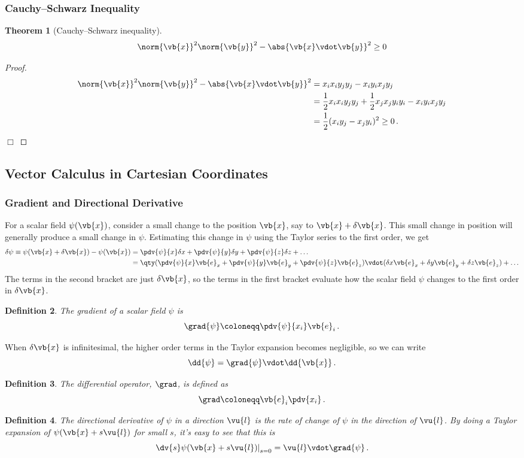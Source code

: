 \documentclass{article}
\theoremstyle{plain}\theoremheaderfont{\normalfont\itshape}\theorembodyfont{\rmfamily}\theoremseparator{.}\newtheorem*{rem}{Remark}\newtheorem*{ex}{Example}\newtheorem*{proof}{Proof}\newtheorem*{altp}{Alternative proof}
\theoremstyle{plain}\theoremheaderfont{\normalfont\bfseries}\theorembodyfont{\rmfamily}\theoremseparator{.}\newtheorem{thm}{Theorem}[section]\newtheorem{lem}[thm]{Lemma}\newtheorem{prop}[thm]{Proposition}\newtheorem*{cor}{Corollary}\newtheorem{defn}[thm]{Definition}\newtheorem{clm}[thm]{Claim}\newtheorem{clminproof}{Claim}
\theoremstyle{break}\theoremheaderfont{\normalfont\itshape}\theorembodyfont{\rmfamily}\theoremseparator{.\medskip}\newtheorem*{proofskip}{Proof}\newtheorem*{exs}{Examples}\newtheorem*{rems}{Remarks}
\theoremstyle{break}\theoremheaderfont{\normalfont\bfseries}\theorembodyfont{\rmfamily}\theoremseparator{.\medskip}\newtheorem{lemskip}[thm]{Lemma}\newtheorem{defnskip}[thm]{Definition}\newtheorem{propskip}[thm]{Proposition}\newtheorem{thmskip}[thm]{Theorem}
\numberwithin{equation}{section}
\newcommand{\qed}{\hfill\ensuremath{\Box}}
\begin{document}
	\subsubsection{Cauchy--Schwarz Inequality}
	\begin{thm}[Cauchy--Schwarz inequality]
		\[\norm{\vb{x}}^2\norm{\vb{y}}^2-\abs{\vb{x}\vdot\vb{y}}^2\ge0\]
	\end{thm}
	
	\begin{proof}
		\begin{align*}
			\norm{\vb{x}}^2\norm{\vb{y}}^2-\abs{\vb{x}\vdot\vb{y}}^2&=x_ix_iy_jy_j-x_iy_ix_jy_j\\
			&=\frac{1}{2}x_ix_iy_jy_j+\frac{1}{2}x_jx_jy_iy_i-x_iy_ix_jy_j\\
			&=\frac{1}{2}(x_iy_j-x_jy_i)^2\ge0\,.
		\end{align*}
		\qed
	\end{proof}
	\subsection{Vector Calculus in Cartesian Coordinates}
	\subsubsection{Gradient and Directional Derivative}
	For a scalar field \(\psi(\vb{x})\), consider a small change to the position \(\vb{x}\), say to \(\vb{x}+\delta\vb{x}\). This small change in position will generally produce a small change in \(\psi\). Estimating this change in \(\psi\) using the Taylor series to the first order, we get
	\begin{align*}
		\delta\psi\equiv\psi(\vb{x}+\delta\vb{x})-\psi(\vb{x})&=\pdv{\psi}{x}\delta x+\pdv{\psi}{y}\delta y+\pdv{\psi}{z}\delta z+\dots\\
		&=\qty(\pdv{\psi}{x}\vb{e}_x+\pdv{\psi}{y}\vb{e}_y+\pdv{\psi}{z}\vb{e}_z)\vdot(\delta x\vb{e}_x+\delta y\vb{e}_y+\delta z\vb{e}_z)+\dots
	\end{align*}
	The terms in the second bracket are just \(\delta\vb{x}\), so the terms in the first bracket evaluate how the scalar field \(\psi\) changes to the first order in \(\delta\vb{x}\).
	\begin{defn}
		The \textit{gradient} of a scalar field \(\psi\) is
		\[\grad{\psi}\coloneqq\pdv{\psi}{x_i}\vb{e}_i\,.\]
	\end{defn}
	When \(\delta\vb{x}\) is infinitesimal, the higher order terms in the Taylor expansion becomes negligible, so we can write
	\[\dd{\psi}=\grad{\psi}\vdot\dd{\vb{x}}\,.\]
	\begin{defn}
		The \textit{differential operator}, \(\grad\), is defined as
		\[\grad\coloneqq\vb{e}_i\pdv{x_i}\,.\]
	\end{defn}
	\begin{defn}
		The \textit{directional derivative} of \(\psi\) in a direction \(\vu{l}\) is the rate of change of \(\psi\) in the direction of \(\vu{l}\). By doing a Taylor expansion of \(\psi(\vb{x}+s\vu{l})\) for small \(s\), it's easy to see that this is
		\[\left. \dv{s} \psi(\vb{x}+s\vu{l}) \right|_{s=0}=\vu{l}\vdot\grad{\psi}\,.\]
	\end{defn}
	
\end{document}
